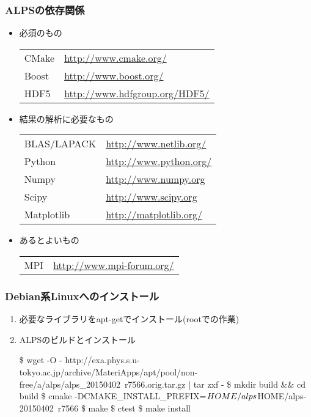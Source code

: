 \begin{frame}
  \frametitle{ALPSの依存関係}
  \begin{itemize}
  \item 必須のもの\\
    \begin{tabular}{ll}
      CMake & \url{http://www.cmake.org/} \\
      Boost & \url{http://www.boost.org/} \\
      HDF5  & \url{http://www.hdfgroup.org/HDF5/} \\
    \end{tabular}
  \item 結果の解析に必要なもの \\
    \begin{tabular}{ll}
      BLAS/LAPACK & \url{http://www.netlib.org/} \\
      Python & \url{http://www.python.org/} \\
      Numpy & \url{http://www.numpy.org} \\
      Scipy & \url{http://www.scipy.org} \\
      Matplotlib & \url{http://matplotlib.org/}
    \end{tabular}
  \item あるとよいもの \\
    \begin{tabular}{ll}
      MPI & \url{http://www.mpi-forum.org/} \\
    \end{tabular}
  \end{itemize}
\end{frame}

\begin{frame}[fragile,shrink=10]
  \frametitle{Debian系Linuxへのインストール}
  \begin{enumerate}
  \item 必要なライブラリをapt-getでインストール(rootでの作業)
  \item ALPSのビルドとインストール
\begin{semiverbatim}
\$ wget -O - http://exa.phys.s.u-tokyo.ac.jp/archive/MateriApps/apt/pool/non-free/a/alps/alps_20150402~r7566.orig.tar.gz | tar zxf -
\$ mkdir build && cd build
\$ cmake -DCMAKE_INSTALL_PREFIX=${HOME}/alps \\
  $HOME/alps-20150402~r7566
\$ make
\$ ctest
\$ make install
\end{semiverbatim}
  \end{enumerate}
\end{frame}


